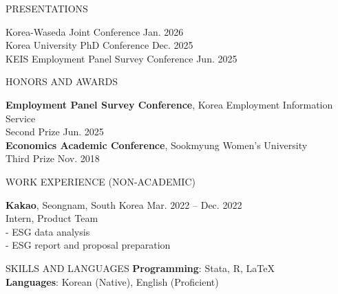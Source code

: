 \documentclass{resume} %
\begin{document}

\begin{rSection}{PRESENTATIONS}

Korea-Waseda Joint Conference \hfill Jan. 2026 \\
Korea University PhD Conference \hfill Dec. 2025 \\
KEIS Employment Panel Survey Conference \hfill Jun. 2025

\end{rSection}


\begin{rSection}{HONORS AND AWARDS}

\textbf{Employment Panel Survey Conference}, Korea Employment Information Service \\
Second Prize \hfill Jun. 2025 \\
\textbf{Economics Academic Conference}, Sookmyung Women's University \\
Third Prize \hfill Nov. 2018

\end{rSection}


\begin{rSection}{WORK EXPERIENCE (NON-ACADEMIC)}

\textbf{Kakao}, Seongnam, South Korea \hfill Mar. 2022 -- Dec. 2022 \\
Intern, Product Team \\
- ESG data analysis \\
- ESG report and proposal preparation

\end{rSection}


\begin{rSection}{ SKILLS AND LANGUAGES } \itemsep -3pt
\textbf{Programming}: Stata, R, \LaTeX \\
\textbf{Languages}: Korean (Native), English (Proficient)
\end{rSection}
\end{document}
